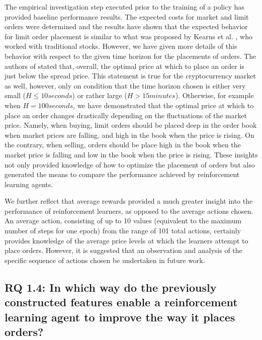     The empirical investigation step executed prior to the training of a policy has provided baseline performance results.
    The expected costs for market and limit orders were determined and the results have shown that the expected behavior for limit order placement is similar to what was proposed by Kearns et al. \cite{nevmyvaka2005electronic}, who worked with traditional stocks.
    However, we have given more details of this behavior with respect to the given time horizon for the placements of orders.
    The authors of \cite{nevmyvaka2005electronic} stated that, overall, the optimal price at which to place an order is just below the spread price.
    This statement is true for the cryptocurrency market as well, however, only on condition that the time horizon chosen is either very small ($H\leq10 seconds$) or rather large ($H>15 minutes$).
    Otherwise, for example when $H=100 seconds$, we have demonstrated that the optimal price at which to place an order changes drastically depending on the fluctuations of the market price.
    Namely, when buying, limit orders should be placed deep in the order book when market prices are falling, and high in the book when the price is rising.
    On the contrary, when selling, orders should be place high in the book when the market price is falling and low in the book when the price is rising.
    These insights not only provided knowledge of how to optimize the placement of orders but also generated the means to compare the performance achieved by reinforcement learning agents.
    
    We further reflect that average rewards provided a much greater insight into the performance of reinforcement learners, as opposed to the average actions chosen.
    An average action, consisting of up to 10 values (equivalent to the maximum number of steps for one epoch) from the range of 101 total actions, certainly provides knowledge of the average price levels at which the learners attempt to place orders.
    However, it is suggested that an observation and analysis of the specific sequence of actions chosen be undertaken in future work.
    
\subsection{RQ 1.4: In which way do the previously constructed features enable a reinforcement learning agent to improve the way it places orders?}


